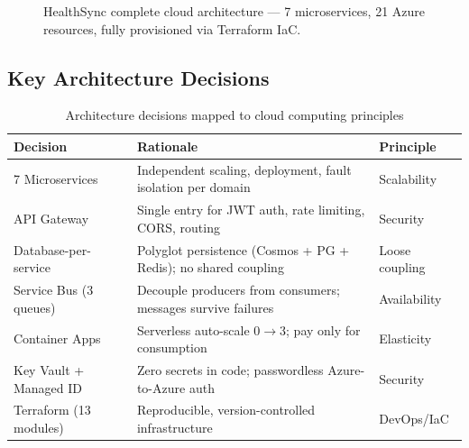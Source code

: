 \documentclass[12pt,a4paper]{article}
\begin{document}
\begin{figure}[p]
{
}
\caption{HealthSync complete cloud architecture --- 7 microservices, 21 Azure resources, fully provisioned via Terraform IaC.}
\label{fig:architecture}
\end{figure}

\subsection{Key Architecture Decisions}

\begin{table}[H]
\centering
\footnotesize
\caption{Architecture decisions mapped to cloud computing principles}
\begin{tabularx}{\textwidth}{@{}lXl@{}}
\toprule
\textbf{Decision} & \textbf{Rationale} & \textbf{Principle} \\
\midrule
7 Microservices & Independent scaling, deployment, fault isolation per domain & Scalability \\
API Gateway & Single entry for JWT auth, rate limiting, CORS, routing & Security \\
Database-per-service & Polyglot persistence (Cosmos + PG + Redis); no shared coupling & Loose coupling \\
Service Bus (3 queues) & Decouple producers from consumers; messages survive failures & Availability \\
Container Apps & Serverless auto-scale 0$\to$3; pay only for consumption & Elasticity \\
Key Vault + Managed ID & Zero secrets in code; passwordless Azure-to-Azure auth & Security \\
Terraform (13 modules) & Reproducible, version-controlled infrastructure & DevOps/IaC \\
\bottomrule
\end{tabularx}
\label{tab:decisions}
\end{table}
\end{document}
